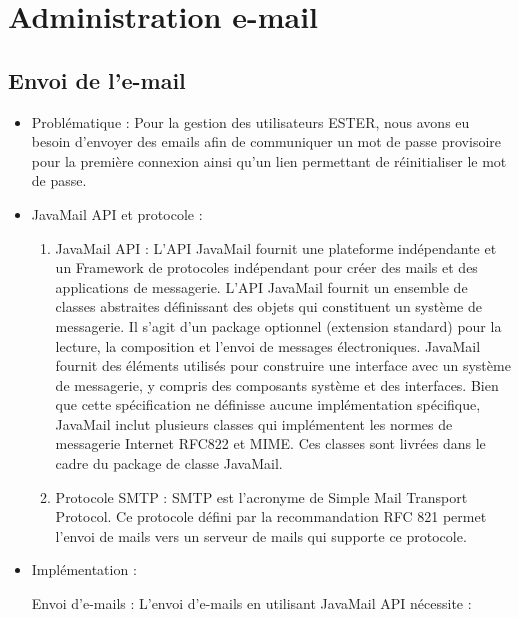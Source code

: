 \section{Administration e-mail}

\subsection{Envoi de l'e-mail}

\begin{itemize}

\item Problématique :
Pour la gestion des utilisateurs ESTER, nous avons eu besoin d’envoyer des emails afin de communiquer un mot de passe provisoire pour la première connexion ainsi qu’un lien permettant de réinitialiser le mot de passe.

\item JavaMail API et protocole :
    
\begin{enumerate}

\item JavaMail API :
L'API JavaMail fournit une plateforme indépendante et un Framework de protocoles indépendant pour créer des mails et des applications de messagerie. L'API JavaMail fournit un ensemble de classes abstraites définissant des objets qui constituent un système de messagerie. Il s’agit d’un package optionnel (extension standard) pour la lecture, la composition et l’envoi de messages électroniques. JavaMail fournit des éléments utilisés pour construire une interface avec un système de messagerie, y compris des composants système et des interfaces. Bien que cette spécification ne définisse aucune implémentation spécifique, JavaMail inclut plusieurs classes qui implémentent les normes de messagerie Internet RFC822 et MIME. Ces classes sont livrées dans le cadre du package de classe JavaMail.
\item Protocole SMTP :
SMTP est l'acronyme de Simple Mail Transport Protocol. Ce protocole défini par la recommandation RFC 821 permet l'envoi de mails vers un serveur de mails qui supporte ce protocole.

\end{enumerate}



\item Implémentation :

Envoi d'e-mails : L’envoi d’e-mails en utilisant JavaMail API nécessite :

\begin{enumerate}


\end{enumerate}
\end{itemize}
